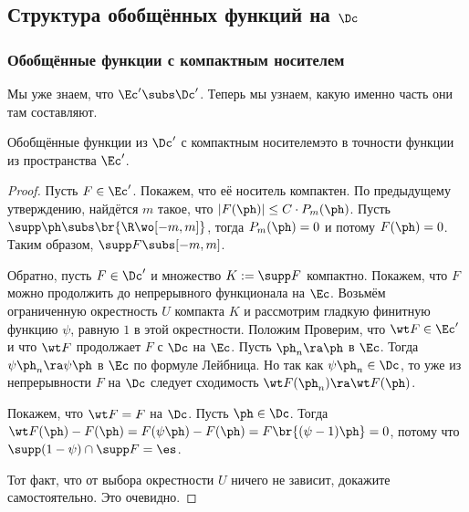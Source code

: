 \documentclass[a4paper]{article}
\begin{document}
\subsection{Структура обобщённых функций на $\Dc$}

\subsubsection{Обобщённые функции с компактным носителем}

Мы уже знаем, что $\Ec' \subs \Dc'$. Теперь мы узнаем, какую именно часть они там составляют.

\begin{theorem}
Обобщённые функции из $\Dc'$ с компактным носителем\т это в точности функции из пространства $\Ec'$.
\end{theorem}
\begin{proof}
Пусть $F \in \Ec'$. Покажем, что её носитель компактен. По предыдущему утверждению,
найдётся $m$ такое, что $|F(\ph)| \le C\cdot P_m(\ph)$. Пусть $\supp\ph \subs \br{\R \wo [-m,m]}$,
тогда $P_m(\ph)=0$ и потому $F(\ph) = 0$. Таким образом, $\supp F \subs [-m,m]$.

Обратно, пусть $F \in \Dc'$ и множество $K := \supp F$ компактно.
Покажем, что $F$ можно продолжить до непрерывного функционала на $\Ec$.
Возьмём ограниченную окрестность $U$ компакта $K$ и рассмотрим гладкую финитную функцию $\psi$,
равную $1$ в этой окрестности. Положим
Проверим, что $\wt F \in \Ec'$ и что $\wt F$ продолжает $F$ с $\Dc$ на $\Ec$.
Пусть $\ph_n \ra \ph$ в $\Ec$. Тогда $\psi\ph_n \ra \psi\ph$ в $\Ec$ по формуле Лейбница.
Но так как $\psi\ph_n \in \Dc$, то уже из непрерывности $F$ на $\Dc$ следует сходимость
$\wt F (\ph_n) \ra \wt F(\ph)$.

Покажем, что $\wt F = F$ на $\Dc$. Пусть $\ph \in \Dc$. Тогда
$\wt F(\ph) - F(\ph) = F(\psi\ph) - F(\ph) = F\br{(\psi-1)\ph} = 0$, потому что
$\supp (1-\psi) \cap \supp F = \es$.

Тот факт, что от выбора окрестности $U$ ничего не зависит, докажите самостоятельно. Это очевидно.
\end{proof}
\end{document}
